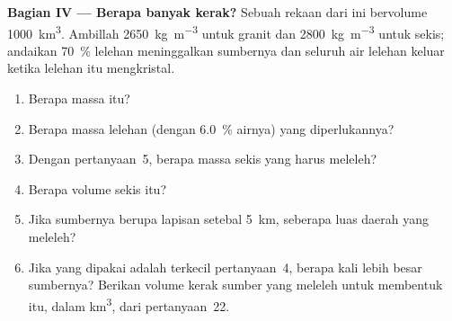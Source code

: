 \begin{problem}
\noindent\textbf{Bagian IV --- Berapa banyak kerak?}
Sebuah  rekaan dari  ini bervolume \qty{1000}{\cubic\kilo\metre}.
Ambillah \qty{2650}{\kilogram\per\cubic\metre} untuk granit dan
\qty{2800}{\kilogram\per\cubic\metre} untuk sekis; andaikan \qty{70}{\percent}
lelehan meninggalkan sumbernya dan seluruh air lelehan keluar ketika lelehan itu mengkristal.
\begin{enumerate}[resume]
\item Berapa massa  itu?
\item Berapa massa lelehan (dengan \qty{6.0}{\percent} airnya) yang diperlukannya?
\item Dengan  pertanyaan~5, berapa massa sekis yang harus meleleh?
\item Berapa volume sekis itu?
\item Jika sumbernya berupa lapisan setebal \qty{5}{km}, seberapa luas daerah yang meleleh?
\item Jika yang dipakai adalah  terkecil pertanyaan~4, berapa kali lebih besar sumbernya?
Berikan volume kerak sumber yang meleleh untuk membentuk  itu, dalam
\unit{\cubic\kilo\metre}, dari pertanyaan~22.
\end{enumerate}
\end{problem}
